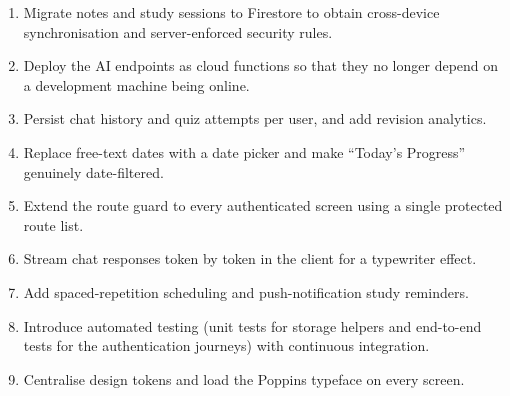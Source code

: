\documentclass[12pt,a4paper,oneside]{report}
\begin{document}
\begin{enumerate}[leftmargin=*, itemsep=2pt]
  \item Migrate notes and study sessions to Firestore to obtain cross-device
        synchronisation and server-enforced security rules.
  \item Deploy the AI endpoints as cloud functions so that they no longer depend on a
        development machine being online.
  \item Persist chat history and quiz attempts per user, and add revision analytics.
  \item Replace free-text dates with a date picker and make ``Today's Progress''
        genuinely date-filtered.
  \item Extend the route guard to every authenticated screen using a single protected
        route list.
  \item Stream chat responses token by token in the client for a typewriter effect.
  \item Add spaced-repetition scheduling and push-notification study reminders.
  \item Introduce automated testing (unit tests for storage helpers and end-to-end
        tests for the authentication journeys) with continuous integration.
  \item Centralise design tokens and load the Poppins typeface on every screen.
\end{enumerate}
\end{document}
